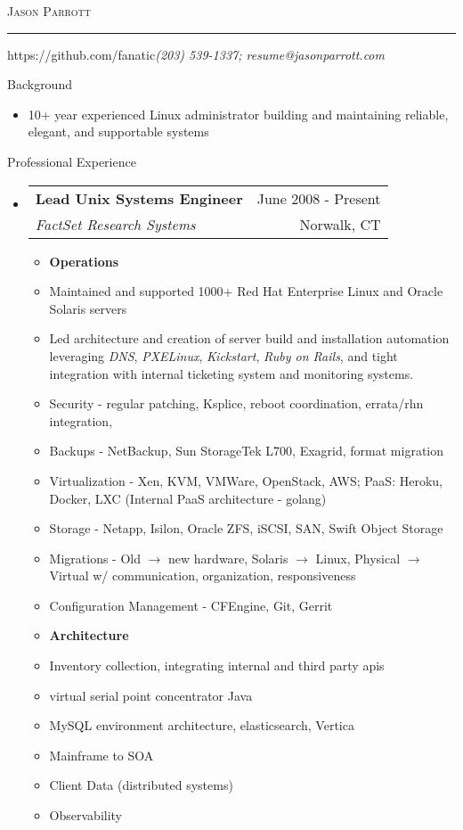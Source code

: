 \documentclass[letterpaper,10pt]{article}
\makeatletter
\newcommand{\name}{Jason Parrott}
\newcommand{\addr}{https://github.com/fanatic}
\newcommand{\phone}{(203) 539-1337}
\newcommand{\email}{resume@jasonparrott.com}
\newcommand{\bigname}[1]{
	\begin{center}\fontfamily{phv}\selectfont\Huge\scshape#1\end{center}
}
\newenvironment{ressection}[1]{
	\vspace{4pt}
	{\fontfamily{phv}\selectfont\Large#1}
	\begin{itemize}
	\vspace{3pt}
}{
	\end{itemize}
}
\newcommand{\resitem}[1]{
	\vspace{-4pt}
	\item \begin{flushleft} #1 \end{flushleft}
}
\newcommand{\ressubitem}[1]{
	\vspace{-1pt}
	\item \begin{flushleft} #1 \end{flushleft}
}
\newcommand{\resbigitem}[4]{
	\vspace{-5pt}
	\item
	\begin{tabular*}{6in}{l@{\extracolsep{\fill}}r}
		\textbf{#1} & #2 \\
		\textit{#3} & #4\\
	\end{tabular*}
}
\newenvironment{ressubsec}[4]{
	\resbigitem{#1}{#2}{#3}{#4}
	\vspace{-2pt}
	\begin{itemize}
}{
	\end{itemize}
}
\makeatother
\begin{document}
\bigname{\name}

\vspace{-8pt} \rule{\textwidth}{1pt}

\vspace{-1pt} {\small \addr \hfill \itshape\phone; \email}

\vspace{8 pt}

\begin{ressection}{Background}
	\item
	10+ year experienced Linux administrator building and maintaining reliable, elegant, and supportable systems
\end{ressection}

\begin{ressection}{Professional Experience}
	\begin{ressubsec}{Lead Unix Systems Engineer}{June 2008 - Present}{FactSet Research Systems}{Norwalk, CT}
		\item{\textbf{Operations}}
		\ressubitem{Maintained and supported 1000+ Red Hat Enterprise Linux and Oracle Solaris servers}
		\ressubitem{Led architecture and creation of server build and installation automation leveraging \textit{DNS}, \textit{PXELinux}, \textit{Kickstart}, \textit{Ruby on Rails}, and tight integration with internal ticketing system and monitoring systems.}
		\ressubitem{Security - regular patching, Ksplice, reboot coordination, errata/rhn integration, }
		\ressubitem{Backups - NetBackup, Sun StorageTek L700, Exagrid, format migration}
		\ressubitem{Virtualization - Xen, KVM, VMWare, OpenStack, AWS; PaaS: Heroku, Docker, LXC (Internal PaaS architecture - golang)}
		\ressubitem{Storage - Netapp, Isilon, Oracle ZFS, iSCSI, SAN,  Swift Object Storage}
		\ressubitem{Migrations - Old $\rightarrow$ new hardware, Solaris $\rightarrow$ Linux, Physical $\rightarrow$ Virtual w/ communication, organization, responsiveness}
		\ressubitem{Configuration Management - CFEngine, Git, Gerrit}
		\resitem{\textbf{Architecture}}
		\ressubitem{Inventory collection, integrating internal and third party apis}
		\ressubitem{virtual serial point concentrator Java}
		\ressubitem{MySQL environment architecture, elasticsearch, Vertica}
		\ressubitem{Mainframe to SOA}
		\ressubitem{Client Data (distributed systems)}
		\ressubitem{Observability}
	\end{ressubsec}


\end{ressection}
\end{document}
